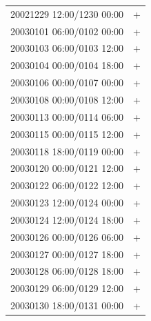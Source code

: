\documentclass[linenumbers,draft]{agujournal}
\begin{document}
\begin{center}
\begin{longtable}{lc}
20021229 12:00/1230 00:00 & + \\
20030101 06:00/0102 00:00 & + \\
20030103 06:00/0103 12:00 & + \\
20030104 00:00/0104 18:00 & + \\
20030106 00:00/0107 00:00 & + \\
20030108 00:00/0108 12:00 & + \\
20030113 00:00/0114 06:00 & + \\
20030115 00:00/0115 12:00 & + \\
20030118 18:00/0119 00:00 & + \\
20030120 00:00/0121 12:00 & + \\
20030122 06:00/0122 12:00 & + \\
20030123 12:00/0124 00:00 & + \\
20030124 12:00/0124 18:00 & + \\
20030126 00:00/0126 06:00 & + \\
20030127 00:00/0127 18:00 & + \\
20030128 06:00/0128 18:00 & + \\
20030129 06:00/0129 12:00 & + \\
20030130 18:00/0131 00:00 & + \\
\hline
\end{longtable}
\end{center}

\pagebreak
\end{document}
